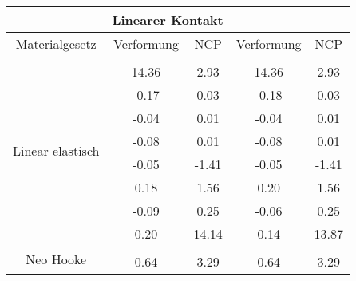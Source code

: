 \begin{table} 
\centering 
\begin{tabular}{c|cc|cc|} 
\cline{2-5} 
 & \multicolumn{2}{|c|}{Linearer Kontakt} &  \\ 
\hline 
\multicolumn{1}{|c|}{Materialgesetz} & \multicolumn{1}{c|}{Verformung} & \multicolumn{1}{c|}{NCP} & \multicolumn{1}{c|}{Verformung} & \multicolumn{1}{c|}{NCP} \\ 
\hline 
\multicolumn{1}{|c|}{\multirow{9}{*}{Linear elastisch}} &\multicolumn{1}{|c|}{} & \multicolumn{1}{|c|}{} & \multicolumn{1}{|c|}{} & \multicolumn{1}{|c|}{} \\ 
\multicolumn{1}{|c|}{} & \multicolumn{1}{|c|}{     14.36} & \multicolumn{1}{|c|}{      2.93} & \multicolumn{1}{|c|}{     14.36} & \multicolumn{1}{|c|}{      2.93} \\ 
\multicolumn{1}{|c|}{} & \multicolumn{1}{|c|}{     -0.17} & \multicolumn{1}{|c|}{      0.03} & \multicolumn{1}{|c|}{     -0.18} & \multicolumn{1}{|c|}{      0.03} \\ 
\multicolumn{1}{|c|}{} & \multicolumn{1}{|c|}{     -0.04} & \multicolumn{1}{|c|}{      0.01} & \multicolumn{1}{|c|}{     -0.04} & \multicolumn{1}{|c|}{      0.01} \\ 
\multicolumn{1}{|c|}{} & \multicolumn{1}{|c|}{     -0.08} & \multicolumn{1}{|c|}{      0.01} & \multicolumn{1}{|c|}{     -0.08} & \multicolumn{1}{|c|}{      0.01} \\ 
\multicolumn{1}{|c|}{} & \multicolumn{1}{|c|}{     -0.05} & \multicolumn{1}{|c|}{     -1.41} & \multicolumn{1}{|c|}{     -0.05} & \multicolumn{1}{|c|}{     -1.41} \\ 
\multicolumn{1}{|c|}{} & \multicolumn{1}{|c|}{      0.18} & \multicolumn{1}{|c|}{      1.56} & \multicolumn{1}{|c|}{      0.20} & \multicolumn{1}{|c|}{      1.56} \\ 
\multicolumn{1}{|c|}{} & \multicolumn{1}{|c|}{     -0.09} & \multicolumn{1}{|c|}{      0.25} & \multicolumn{1}{|c|}{     -0.06} & \multicolumn{1}{|c|}{      0.25} \\ 
\multicolumn{1}{|c|}{} & \multicolumn{1}{|c|}{      0.20} & \multicolumn{1}{|c|}{     14.14} & \multicolumn{1}{|c|}{      0.14} & \multicolumn{1}{|c|}{     13.87} \\ 
\hline 
\multicolumn{1}{|c|}{\multirow{7}{*}{Neo Hooke}} &\multicolumn{1}{|c|}{} & \multicolumn{1}{|c|}{} & \multicolumn{1}{|c|}{} & \multicolumn{1}{|c|}{} \\ 
\multicolumn{1}{|c|}{} & \multicolumn{1}{|c|}{      0.64} & \multicolumn{1}{|c|}{      3.29} & \multicolumn{1}{|c|}{      0.64} & \multicolumn{1}{|c|}{      3.29} \\ 

\end{tabular}
\end{table}
